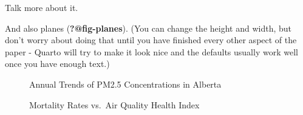 \documentclass[
  letterpaper,
  DIV=11,
  numbers=noendperiod]{scrartcl}
\begin{document}
Talk more about it.

And also planes (\textbf{?@fig-planes}). (You can change the height and
width, but don't worry about doing that until you have finished every
other aspect of the paper - Quarto will try to make it look nice and the
defaults usually work well once you have enough text.)

\begin{figure}


\caption{\label{fig-annual}Annual Trends of PM2.5 Concentrations in
Alberta}

\end{figure}%

\begin{figure}


\caption{\label{fig-four}Mortality Rates vs.~Air Quality Health Index}

\end{figure}%
\end{document}
